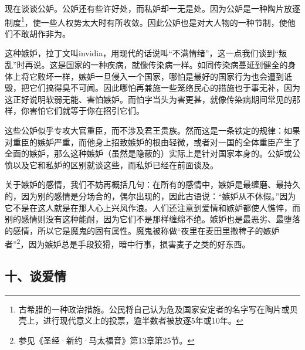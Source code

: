 \par 现在谈谈公妒。公妒还有些许好处，而私妒却一无是处。因为公妒是一种陶片放逐制度\footnote{古希腊的一种政治措施。公民将自己认为危及国家安定者的名字写在陶片或贝壳上，进行现代意义上的投票，逾半数者被放逐5年或10年。}，使一些人权势太大时有所收敛。因此公妒也是对大人物的一种节制，使他们不敢胡作非为。
\par 这种嫉妒，拉丁文叫invidia，用现代的话说叫“不满情绪”，这一点我们谈到“叛乱”时再说。这是国家的一种疾病，就像传染病一样。如同传染病蔓延到健全的身体上将它败坏一样，嫉妒一旦侵入一个国家，哪怕是最好的国家行为也会遭到诋毁，把它们搞得臭不可闻。因此哪怕再兼施一些笼络民心的措施也于事无补，因为这正好说明软弱无能、害怕嫉妒。而怕字当头为害更甚，就像传染病期间常见的那样，你害怕它们就等于你在招引它们。
\par 这些公妒似乎专攻大官重臣，而不涉及君王贵族。然而这是一条铁定的规律：如果对重臣的嫉妒严重，而他身上招致嫉妒的根由轻微，或者对一国的全体重臣产生了全面的嫉妒，那么这种嫉妒（虽然是隐蔽的）实际上是针对国家本身的。公妒或公愤以及它和私妒的区别就谈这些，而私妒已经在前面谈及。
\par 关于嫉妒的感情，我们不妨再概括几句：在所有的感情中，嫉妒是最缠磨、最持久的，因为别的感情是分场合的，偶尔出现的，因此古语说：“嫉妒从不休假。”因为它不是在这人就是在那人心上兴风作浪。人们还注意到爱情和嫉妒都使人憔悴，而别的感情则没有这种能耐，因为它们不是那样缠绵不绝。嫉妒也是最恶劣、最堕落的感情，所以它是魔鬼的固有属性。魔鬼被称做“夜里在麦田里撒稗子的嫉妒者”\footnote{参见《圣经·新约·马太福音》第13章第25节。}，因为嫉妒总是手段狡猾，暗中行事，损害麦子之类的好东西。



\subsection*{十、谈爱情}

